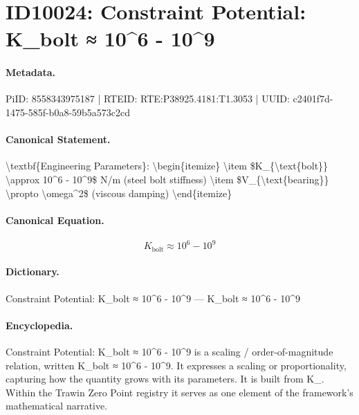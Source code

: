 \section*{ID10024: Constraint Potential: K\_bolt ≈ 10\textasciicircum{}6 - 10\textasciicircum{}9}
\paragraph{Metadata.}
PiID: 8558343975187 | RTEID: RTE:P38925.4181:T1.3053 | UUID: c2401f7d-1475-585f-b0a8-59b5a573c2cd

\paragraph{Canonical Statement.}
\textbackslash{}textbf\{Engineering Parameters\}: \textbackslash{}begin\{itemize\} \textbackslash{}item \$K\_\{\textbackslash{}text\{bolt\}\} \textbackslash{}approx 10\textasciicircum{}6 - 10\textasciicircum{}9\$ N/m (steel bolt stiffness) \textbackslash{}item \$V\_\{\textbackslash{}text\{bearing\}\} \textbackslash{}propto \textbackslash{}omega\textasciicircum{}2\$ (viscous damping) \textbackslash{}end\{itemize\}

\paragraph{Canonical Equation.}
\[
K_{\text{bolt}} \approx 10^6 - 10^9
\]

\paragraph{Dictionary.}
Constraint Potential: K\_bolt ≈ 10\textasciicircum{}6 - 10\textasciicircum{}9 — K\_bolt ≈ 10\textasciicircum{}6 - 10\textasciicircum{}9

\paragraph{Encyclopedia.}
Constraint Potential: K\_bolt ≈ 10\textasciicircum{}6 - 10\textasciicircum{}9 is a scaling / order-of-magnitude relation, written K\_bolt ≈ 10\textasciicircum{}6 - 10\textasciicircum{}9. It expresses a scaling or proportionality, capturing how the quantity grows with its parameters. It is built from K\_. Within the Trawin Zero Point registry it serves as one element of the framework's mathematical narrative.
